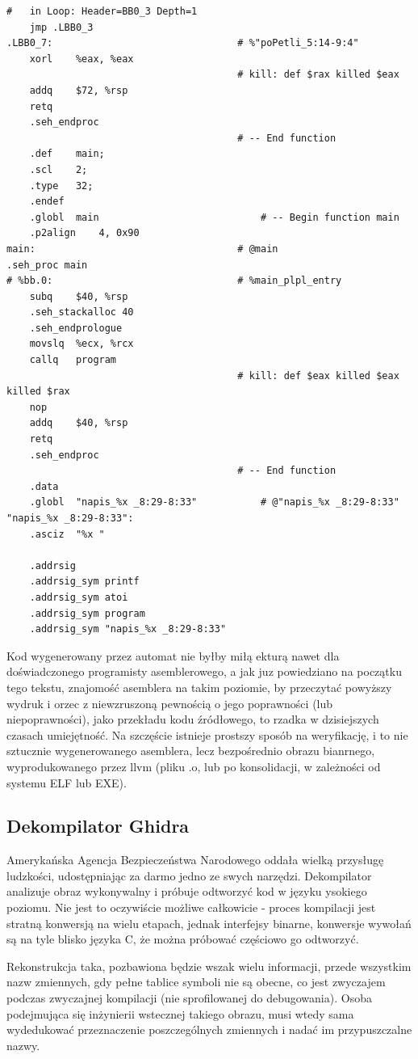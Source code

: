 \begin{lstlisting}[basicstyle=\scriptsize]
                                        #   in Loop: Header=BB0_3 Depth=1
	jmp	.LBB0_3
.LBB0_7:                                # %"poPetli_5:14-9:4"
	xorl	%eax, %eax
                                        # kill: def $rax killed $eax
	addq	$72, %rsp
	retq
	.seh_endproc
                                        # -- End function
	.def	main;
	.scl	2;
	.type	32;
	.endef
	.globl	main                            # -- Begin function main
	.p2align	4, 0x90
main:                                   # @main
.seh_proc main
# %bb.0:                                # %main_plpl_entry
	subq	$40, %rsp
	.seh_stackalloc 40
	.seh_endprologue
	movslq	%ecx, %rcx
	callq	program
                                        # kill: def $eax killed $eax killed $rax
	nop
	addq	$40, %rsp
	retq
	.seh_endproc
                                        # -- End function
	.data
	.globl	"napis_%x _8:29-8:33"           # @"napis_%x _8:29-8:33"
"napis_%x _8:29-8:33":
	.asciz	"%x "

	.addrsig
	.addrsig_sym printf
	.addrsig_sym atoi
	.addrsig_sym program
	.addrsig_sym "napis_%x _8:29-8:33"

\end{lstlisting}
Kod wygenerowany przez automat nie byłby miłą ekturą nawet dla doświadczonego programisty asemblerowego, a jak juz powiedziano na początku tego tekstu, znajomość asemblera na takim poziomie, by przeczytać powyższy wydruk i orzec z niewzruszoną pewnością o jego poprawności (lub niepoprawności), jako przekładu kodu źródłowego, to rzadka w dzisiejszych czasach umiejętność. Na szczęście istnieje prostszy sposób na weryfikację, i to nie sztucznie wygenerowanego asemblera, lecz bezpośrednio obrazu bianrnego, wyprodukowanego przez llvm (pliku .o, lub po konsolidacji, w zależności od systemu ELF lub EXE).
\subsection{Dekompilator Ghidra}
Amerykańska Agencja Bezpieczeństwa Narodowego oddała wielką przysługę ludzkości, udostępniając za darmo jedno ze swych narzędzi.\cite{ghidra} Dekompilator analizuje obraz wykonywalny i próbuje odtworzyć kod w języku ysokiego poziomu. Nie jest to oczywiście możliwe całkowicie - proces kompilacji jest stratną konwersją na wielu etapach, jednak interfejsy binarne, konwersje wywołań są na tyle blisko języka C, że można próbować częściowo go odtworzyć. 

Rekonstrukcja taka, pozbawiona będzie wszak wielu informacji, przede wszystkim nazw zmiennych, gdy pełne tablice symboli nie są obecne, co jest zwyczajem podczas zwyczajnej kompilacji (nie sprofilowanej do debugowania). Osoba podejmująca się inżynierii wstecznej takiego obrazu, musi wtedy sama wydedukować przeznaczenie poszczególnych zmiennych i nadać im przypuszczalne nazwy.

